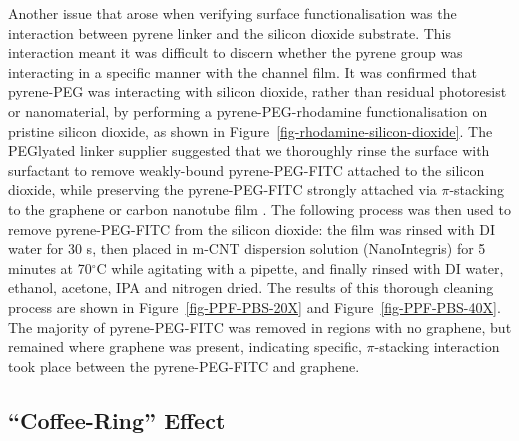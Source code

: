 \documentclass[
  a4paper,
]{scrbook}
\begin{document}
Another issue that arose when verifying surface functionalisation was
the interaction between pyrene linker and the silicon dioxide substrate.
This interaction meant it was difficult to discern whether the pyrene
group was interacting in a specific manner with the channel film. It was
confirmed that pyrene-PEG was interacting with silicon dioxide, rather
than residual photoresist or nanomaterial, by performing a
pyrene-PEG-rhodamine functionalisation on pristine silicon dioxide, as
shown in Figure~\ref{fig-rhodamine-silicon-dioxide}. The PEGlyated
linker supplier suggested that we thoroughly rinse the surface with
surfactant to remove weakly-bound pyrene-PEG-FITC attached to the
silicon dioxide, while preserving the pyrene-PEG-FITC strongly attached
via \(\pi\)-stacking to the graphene or carbon nanotube film
\autocite{CreativePEGworks2022}. The following process was then used to
remove pyrene-PEG-FITC from the silicon dioxide: the film was rinsed
with DI water for 30 s, then placed in m-CNT dispersion solution
(NanoIntegris) for 5 minutes at 70\(^\circ\)C while agitating with a
pipette, and finally rinsed with DI water, ethanol, acetone, IPA and
nitrogen dried. The results of this thorough cleaning process are shown
in Figure~\ref{fig-PPF-PBS-20X} and Figure~\ref{fig-PPF-PBS-40X}. The
majority of pyrene-PEG-FITC was removed in regions with no graphene, but
remained where graphene was present, indicating specific,
\(\pi\)-stacking interaction took place between the pyrene-PEG-FITC and
graphene.

\hypertarget{sec-coffee-ring}{%
\subsection{``Coffee-Ring'' Effect}\label{sec-coffee-ring}}
\end{document}
